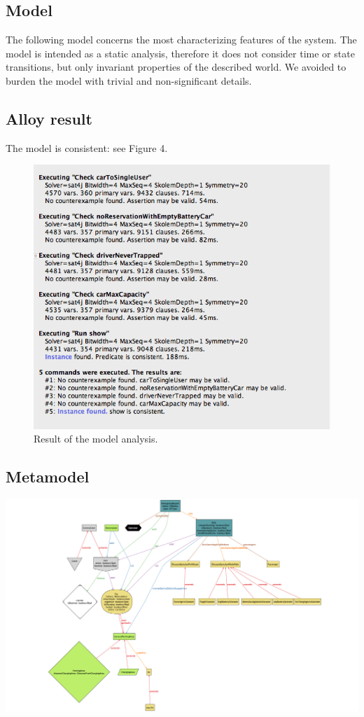 \subsection{Model}
The following model concerns the most characterizing features of the system. The model is intended as a static analysis, therefore it does not consider time or state transitions, but only invariant properties of the described world.
We avoided to burden the model with trivial and non-significant details.



\subsection{Alloy result}
	The model is consistent: see Figure 4.
	\begin{figure}
		\includegraphics[width=\textwidth]{img/alloy_output.png}
		\caption{Result of the model analysis.}
		\label{figure 1}
	\end{figure}

	\begin{landscape}
		\subsection{Metamodel}
		\includegraphics[width=1.5\textwidth, center]{img/metamodel.png}
	\end{landscape}


